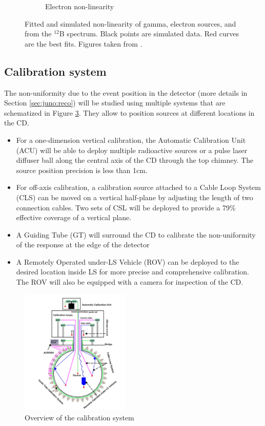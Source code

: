 \documentclass[../main.tex]{subfiles}
\begin{document}
\begin{figure}[ht]
\begin{subfigure}[b]{0.37\textwidth}
    \caption{Electron non-linearity}
    \label{fig:juno:nl:electron}
  \end{subfigure}
  \caption{Fitted and simulated non-linearity of gamma, electron sources, and from the $^{12}$B spectrum. Black points are simulated data. Red curves are the best fits. Figures taken from \cite{juno_collaboration_calibration_2021}.}
  \label{fig:juno:nl}
\end{figure}

\subsection{Calibration system}

The non-uniformity due to the event position in the detector (more details in Section \ref{sec:juno:reco}) will be studied using multiple systems that are schematized in Figure \ref{fig:juno:calib}. They allow to position sources at different locations in the CD.

\begin{itemize}
  \item For a one-dimension vertical calibration, the Automatic Calibration Unit (ACU) will be able to deploy multiple radioactive sources or a pulse laser diffuser ball along the central axis of the CD through the top chimney. The source position precision is less than 1cm.
  \item For off-axis calibration, a calibration source attached to a Cable Loop System (CLS) can be moved on a vertical half-plane by adjusting the length of two connection cables. Two sets of CSL will be deployed to provide a 79\% effective coverage of a vertical plane.
  \item A Guiding Tube (GT) will surround the CD to calibrate the non-uniformity of the response at the edge of the detector
  \item A Remotely Operated under-LS Vehicle (ROV) can be deployed to the desired location inside LS for more precise and comprehensive calibration. The ROV will also be equipped with a camera for inspection of the CD.
\end{itemize}

\begin{figure}[ht]
  \centering
  \includegraphics[height=6cm]{images/juno/calib.png}
  \caption{Overview of the calibration system}
  \label{fig:juno:calib}
\end{figure}
\end{document}
